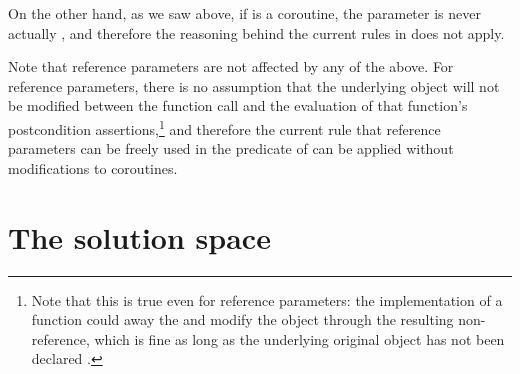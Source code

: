 On the other hand, as we saw above, if  is a coroutine, the parameter is never actually , and therefore the reasoning behind the current rules in \cite{P2900R8} does not apply. 

Note that reference parameters are not affected by any of the above. For reference parameters, there is no assumption that the underlying object will not be modified between the function call and the evaluation of that function's postcondition assertions,\footnote{Note that this is true even for  reference parameters: the implementation of a function could  away the  and modify the object through the resulting non- reference, which is fine as long as the underlying original object has not been declared .} and therefore the current rule that reference parameters can be freely used in the predicate of  can be applied without modifications to coroutines.

\section{The solution space}
\label{solutions}

